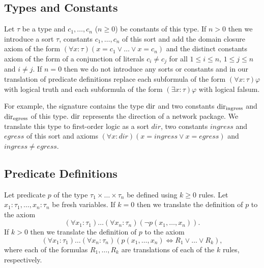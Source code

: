 \subsection{Types and Constants}\label{sect:aws/fol/types}
Let $\tau$ be a type and $c_1,\ldots,c_n$ ($n\ge0$) be constants of this type. If $n>0$ then we introduce a sort $\tau$, constants $c_1,\ldots,c_n$ of this sort and add the domain closure axiom of the form $(\forall x:\tau)(x=c_1 \vee\ldots\vee x=c_n)$ and the distinct constants axiom of the form of a conjunction of literals $c_i\not=c_j$ for all $1\le i\le n$, $1\le j\le n$ and $i\not=j$. If $n=0$ then we do not introduce any sorts or constants and in our translation of predicate definitions replace each subformula of the form $(\forall x:\tau)\varphi$ with logical truth and each subformula of the form $(\exists x:\tau)\varphi$ with logical falsum.

For example, the signature contains the type $\mathrm{dir}$ and two constants $\mathrm{dir}_\text{ingress}$ and $\mathrm{dir}_\text{egress}$ of this type. $\mathrm{dir}$ represents the direction of a network package. We translate this type to first-order logic as a sort $\mathit{dir}$, two constants $\mathit{ingress}$ and $\mathit{egress}$ of this sort and axioms $(\forall x:\mathit{dir})(x=\mathit{ingress}\vee x=\mathit{egress})$ and $\mathit{ingress}\neq\mathit{egress}$.


\subsection{Predicate Definitions}\label{sect:aws/fol/predicates}

Let predicate $p$ of the type $\tau_1\times\ldots\times\tau_n$ be defined using $k\ge0$ rules. Let $x_1:\tau_1,\ldots,x_n:\tau_n$ be fresh variables. If $k=0$ then we translate the definition of $p$ to the axiom $$(\forall x_1:\tau_1)\ldots(\forall x_n:\tau_n)(\neg p(x_1,\ldots,x_n)).$$ If $k>0$ then we translate the definition of $p$ to the axiom $$(\forall x_1:\tau_1)\ldots(\forall x_n:\tau_n)(p(x_1,\ldots,x_n)\Leftrightarrow R_1\vee\ldots\vee R_k),$$ where each of the formulas $R_1,\ldots,R_k$ are translations of each of the $k$ rules, respectively.

